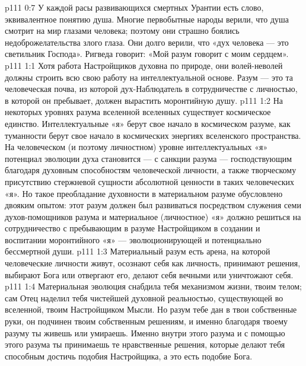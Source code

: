 \vs p111 0:7 У каждой расы развивающихся смертных Урантии есть слово, эквивалентное понятию душа. Многие первобытные народы верили, что душа смотрит на мир глазами человека; поэтому они страшно боялись недоброжелательства злого глаза. Они долго верили, что «дух человека --- это светильник Господа». Ригведа говорит: «Мой разум говорит с моим сердцем».
\vs p111 1:1 Хотя работа Настройщиков духовна по природе, они волей\hyp{}неволей должны строить всю свою работу на интеллектуальной основе. Разум --- это та человеческая почва, из которой дух\hyp{}Наблюдатель в сотрудничестве с личностью, в которой он пребывает, должен вырастить моронтийную душу.
\vs p111 1:2 На некоторых уровнях разума вселенной вселенных существует космическое единство. Интеллектуальные «я» берут свое начало в космическом разуме, как туманности берут свое начало в космических энергиях вселенского пространства. На человеческом (и поэтому личностном) уровне интеллектуальных «я» потенциал эволюции духа становится --- с санкции разума --- господствующим благодаря духовным способностям человеческой личности, а также творческому присутствию стержневой сущности абсолютной ценности в таких человеческих «я». Но такое преобладание духовности в материальном разуме обусловлено двояким опытом: этот разум должен был развиваться посредством служения семи духов\hyp{}помощников разума и материальное (личностное) «я» должно решиться на сотрудничество с пребывающим в разуме Настройщиком в создании и воспитании моронтийного «я» --- эволюционирующей и потенциально бессмертной души.
\vs p111 1:3 \pc Материальный разум есть арена, на которой человеческие личности живут, осознают себя как личность, принимают решения, выбирают Бога или отвергают его, делают себя вечными или уничтожают себя.
\vs p111 1:4 \pc Материальная эволюция снабдила тебя механизмом жизни, твоим телом; сам Отец наделил тебя чистейшей духовной реальностью, существующей во вселенной, твоим Настройщиком Мысли. Но разум тебе дан в твои собственные руки, он подчинен твоим собственным решениям, и именно благодаря твоему разуму ты живешь или умираешь. Именно внутри этого разума и с помощью этого разума ты принимаешь те нравственные решения, которые делают тебя способным достичь подобия Настройщика, а это есть подобие Бога.

